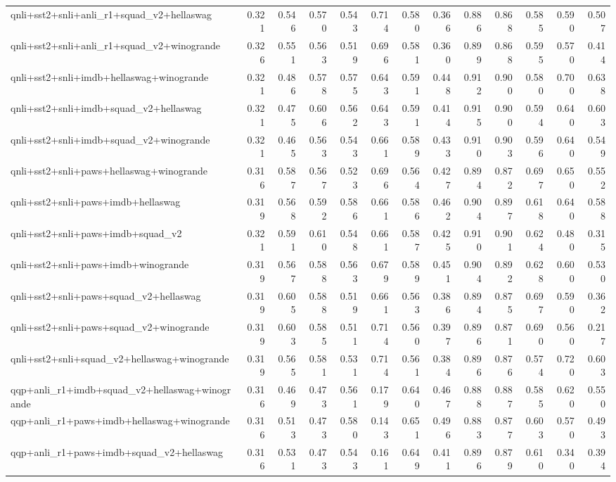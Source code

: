 \begin{table}[t]
\begin{tabular}{lrrrrrrrrrrrr}
    qnli+sst2+snli+anli\_r1+squad\_v2+hellaswag & 0.321 & 0.546 & 0.570 & 0.543 & 0.714 & 0.580 & 0.366 & 0.886 & 0.868 & 0.585 & 0.590 & 0.507 \\
    qnli+sst2+snli+anli\_r1+squad\_v2+winogrande & 0.326 & 0.551 & 0.563 & 0.519 & 0.696 & 0.581 & 0.360 & 0.899 & 0.868 & 0.595 & 0.570 & 0.414 \\
    qnli+sst2+snli+imdb+hellaswag+winogrande & 0.321 & 0.486 & 0.578 & 0.575 & 0.643 & 0.591 & 0.448 & 0.912 & 0.900 & 0.580 & 0.700 & 0.638 \\
    qnli+sst2+snli+imdb+squad\_v2+hellaswag & 0.321 & 0.475 & 0.606 & 0.562 & 0.643 & 0.591 & 0.414 & 0.915 & 0.900 & 0.594 & 0.640 & 0.603 \\
    qnli+sst2+snli+imdb+squad\_v2+winogrande & 0.321 & 0.465 & 0.563 & 0.543 & 0.661 & 0.589 & 0.433 & 0.910 & 0.903 & 0.596 & 0.640 & 0.549 \\
    qnli+sst2+snli+paws+hellaswag+winogrande & 0.316 & 0.587 & 0.567 & 0.523 & 0.696 & 0.564 & 0.427 & 0.894 & 0.872 & 0.697 & 0.650 & 0.552 \\
    qnli+sst2+snli+paws+imdb+hellaswag & 0.319 & 0.568 & 0.592 & 0.586 & 0.661 & 0.586 & 0.462 & 0.904 & 0.897 & 0.618 & 0.640 & 0.588 \\
    qnli+sst2+snli+paws+imdb+squad\_v2 & 0.321 & 0.591 & 0.610 & 0.548 & 0.661 & 0.587 & 0.425 & 0.910 & 0.901 & 0.624 & 0.480 & 0.315 \\
    qnli+sst2+snli+paws+imdb+winogrande & 0.319 & 0.567 & 0.588 & 0.563 & 0.679 & 0.589 & 0.451 & 0.904 & 0.892 & 0.628 & 0.600 & 0.530 \\
    qnli+sst2+snli+paws+squad\_v2+hellaswag & 0.319 & 0.605 & 0.588 & 0.519 & 0.661 & 0.563 & 0.386 & 0.894 & 0.875 & 0.697 & 0.590 & 0.362 \\
    qnli+sst2+snli+paws+squad\_v2+winogrande & 0.319 & 0.603 & 0.585 & 0.511 & 0.714 & 0.560 & 0.397 & 0.896 & 0.871 & 0.690 & 0.560 & 0.217 \\
    qnli+sst2+snli+squad\_v2+hellaswag+winogrande & 0.319 & 0.565 & 0.581 & 0.531 & 0.714 & 0.561 & 0.384 & 0.896 & 0.876 & 0.574 & 0.720 & 0.603 \\
    qqp+anli\_r1+imdb+squad\_v2+hellaswag+winogrande & 0.316 & 0.469 & 0.473 & 0.561 & 0.179 & 0.640 & 0.467 & 0.888 & 0.887 & 0.585 & 0.620 & 0.550 \\
    qqp+anli\_r1+paws+imdb+hellaswag+winogrande & 0.316 & 0.513 & 0.473 & 0.580 & 0.143 & 0.651 & 0.496 & 0.883 & 0.877 & 0.603 & 0.570 & 0.493 \\
    qqp+anli\_r1+paws+imdb+squad\_v2+hellaswag & 0.316 & 0.531 & 0.473 & 0.543 & 0.161 & 0.649 & 0.411 & 0.896 & 0.879 & 0.610 & 0.340 & 0.394 \\

\end{tabular}
\end{table}
